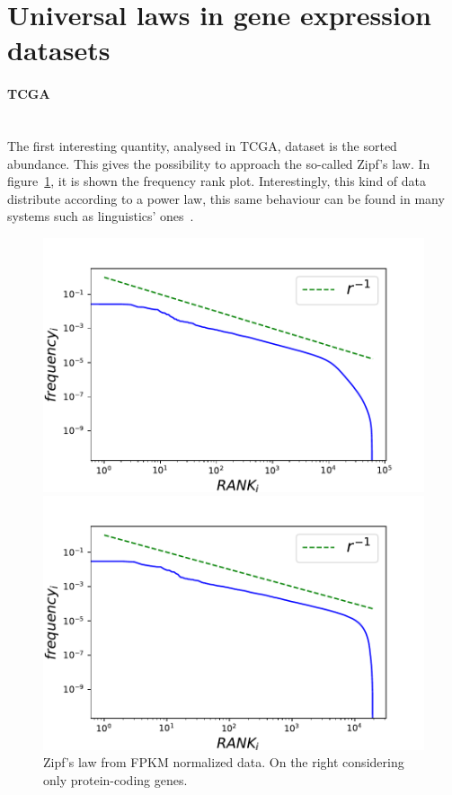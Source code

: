 \section{Universal laws in gene expression datasets}\label{sec:universallaws}
\paragraph{TCGA}\mbox{} \\
The first interesting quantity, analysed in TCGA, dataset is the sorted abundance. This gives the possibility to approach the so-called Zipf's law.
In figure~\ref{fig:structure/tcga/globalZipf}, it is shown the frequency rank plot. Interestingly, this kind of data distribute according to a power law, this same behaviour can be found in many systems such as linguistics' ones~\cite{altmann2016statistical}.
\begin{figure}[htb!]
	\centering
	\begin{minipage}{0.45\textwidth}
		\includegraphics[width=0.95\linewidth]{pictures/structure/tcga/globalzipf_fpkmall.pdf}
	\end{minipage}
	\hspace{3mm}
	\begin{minipage}{0.45\textwidth}
		\includegraphics[width=0.95\linewidth]{pictures/structure/tcga/globalzipf_fpkm.pdf}
	\end{minipage}
	\caption{Zipf's law from FPKM normalized data. On the right considering only protein-coding genes.}
	\label{fig:structure/tcga/globalZipf}
\end{figure}

